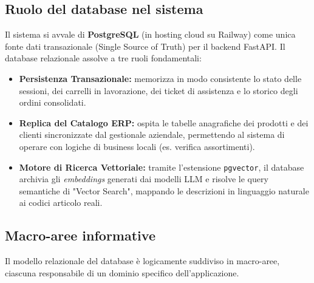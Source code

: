 \documentclass[a4paper, 11pt, oneside]{scrartcl}
\begin{document}
\subsection{Ruolo del database nel sistema}
Il sistema si avvale di \textbf{PostgreSQL} (in hosting cloud su Railway) come unica fonte dati transazionale (Single Source of Truth) per il backend FastAPI. 
Il database relazionale assolve a tre ruoli fondamentali:
\begin{itemize}
    \item \textbf{Persistenza Transazionale:} memorizza in modo consistente lo stato delle sessioni, dei carrelli in lavorazione, dei ticket di assistenza e lo storico degli ordini consolidati.
    \item \textbf{Replica del Catalogo ERP:} ospita le tabelle anagrafiche dei prodotti e dei clienti sincronizzate dal gestionale aziendale, permettendo al sistema di operare con logiche di business locali (es. verifica assortimenti).
    \item \textbf{Motore di Ricerca Vettoriale:} tramite l'estensione \texttt{pgvector}, il database archivia gli \textit{embeddings} generati dai modelli LLM e risolve le query semantiche di "Vector Search", mappando le descrizioni in linguaggio naturale ai codici articolo reali.
\end{itemize}

\subsection{Macro-aree informative}
Il modello relazionale del database è logicamente suddiviso in macro-aree, ciascuna responsabile di un dominio specifico dell'applicazione.
\end{document}
